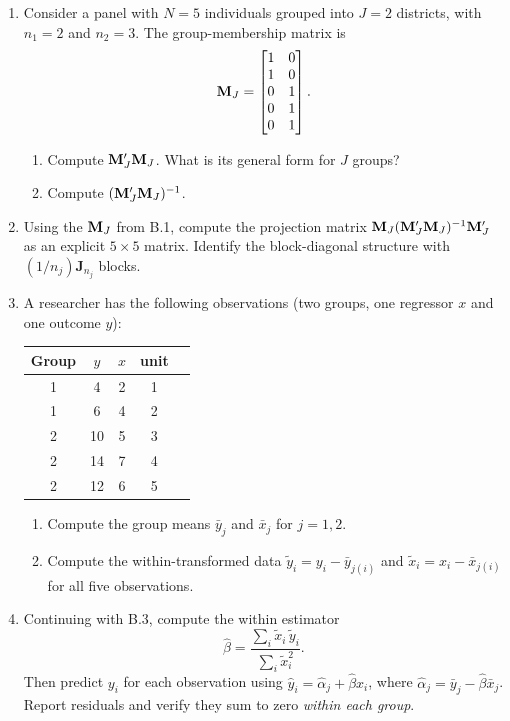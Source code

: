 \documentclass{article}
\begin{document}
\begin{enumerate}[label=\textbf{B.\arabic*},leftmargin=*,itemsep=10pt]

\item  Consider a panel with $N = 5$ individuals grouped into $J = 2$ districts, with $n_1 = 2$ and $n_2 = 3$.  The group-membership matrix is
$${\mathbf M}_J = \begin{bmatrix}1 & 0\\ 1 & 0\\ 0 & 1\\ 0 & 1\\ 0 & 1\end{bmatrix}.$$
\begin{enumerate}[label=(\alph*)]
  \item Compute ${\mathbf M}_J'{\mathbf M}_J$.  What is its general form for $J$ groups?
  \item Compute $({\mathbf M}_J'{\mathbf M}_J)^{-1}$.
\end{enumerate}

\item  Using the ${\mathbf M}_J$ from B.1, compute the projection matrix ${\mathbf M}_J({\mathbf M}_J'{\mathbf M}_J)^{-1}{\mathbf M}_J'$ as an explicit $5\times 5$ matrix.  Identify the block-diagonal structure with $(1/n_j)\bm J_{n_j}$ blocks.

\item  A researcher has the following observations (two groups, one regressor $x$ and one outcome $y$):
\begin{center}
\begin{tabular}{c|ccc|c}
Group & $y$ & $x$ & unit & \\
\hline
1 & 4 & 2 & 1 & \\
1 & 6 & 4 & 2 & \\
2 & 10 & 5 & 3 & \\
2 & 14 & 7 & 4 & \\
2 & 12 & 6 & 5 &
\end{tabular}
\end{center}
\begin{enumerate}[label=(\alph*)]
  \item Compute the group means $\bar y_j$ and $\bar x_j$ for $j = 1, 2$.
  \item Compute the within-transformed data $\tilde y_i = y_i - \bar y_{j(i)}$ and $\tilde x_i = x_i - \bar x_{j(i)}$ for all five observations.
\end{enumerate}

\item  Continuing with B.3, compute the within estimator
$$\hat\beta = \frac{\sum_i \tilde x_i\,\tilde y_i}{\sum_i \tilde x_i^2}.$$
Then predict $y_i$ for each observation using $\hat y_i = \hat\alpha_j + \hat\beta x_i$, where $\hat\alpha_j = \bar y_j - \hat\beta\bar x_j$.  Report residuals and verify they sum to zero \emph{within each group}.


\end{enumerate}
\end{document}
